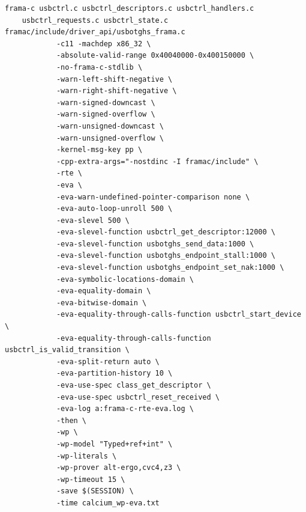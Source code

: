 \begin{lstlisting}[style=CStyle]
	frama-c usbctrl.c usbctrl_descriptors.c usbctrl_handlers.c
	usbctrl_requests.c usbctrl_state.c framac/include/driver_api/usbotghs_frama.c
			-c11 -machdep x86_32 \
	        -absolute-valid-range 0x40040000-0x400150000 \
	        -no-frama-c-stdlib \
	        -warn-left-shift-negative \
	        -warn-right-shift-negative \
	        -warn-signed-downcast \
	        -warn-signed-overflow \
	        -warn-unsigned-downcast \
	        -warn-unsigned-overflow \
			-kernel-msg-key pp \
			-cpp-extra-args="-nostdinc -I framac/include" \
		    -rte \
		    -eva \
		    -eva-warn-undefined-pointer-comparison none \
		    -eva-auto-loop-unroll 500 \
		    -eva-slevel 500 \
		    -eva-slevel-function usbctrl_get_descriptor:12000 \
		    -eva-slevel-function usbotghs_send_data:1000 \
		    -eva-slevel-function usbotghs_endpoint_stall:1000 \
		    -eva-slevel-function usbotghs_endpoint_set_nak:1000 \
		    -eva-symbolic-locations-domain \
		    -eva-equality-domain \
		    -eva-bitwise-domain \
		    -eva-equality-through-calls-function usbctrl_start_device \
		    -eva-equality-through-calls-function usbctrl_is_valid_transition \
		    -eva-split-return auto \
		    -eva-partition-history 10 \
		    -eva-use-spec class_get_descriptor \
		    -eva-use-spec usbctrl_reset_received \
		    -eva-log a:frama-c-rte-eva.log \
   		    -then \
   		    -wp \
  			-wp-model "Typed+ref+int" \
  			-wp-literals \
  			-wp-prover alt-ergo,cvc4,z3 \
   			-wp-timeout 15 \
   			-save $(SESSION) \
   			-time calcium_wp-eva.txt
\end{lstlisting}

